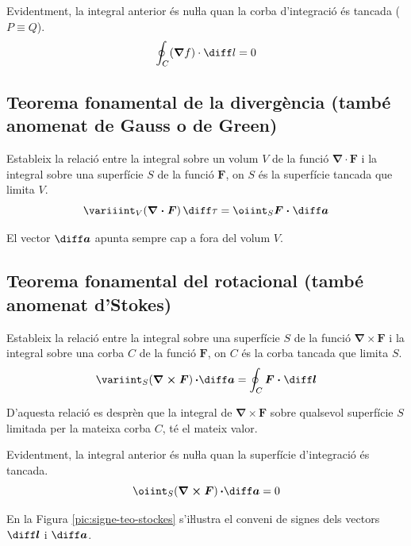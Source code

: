 \documentclass[catalan,a4paper,twoside,11pt]{article}
\begin{document}
Evidentment, la integral anterior és nuŀla quan la corba d'integració és tancada ($P \equiv Q$).
\begin{equation}
    \oint_C (\boldsymbol{\nabla}f) \cdot \diff l = 0
\end{equation}

\subsection{Teorema fonamental de la divergència (també anomenat de Gauss o de Green)}
Estableix la relació entre la integral sobre un volum $V$ de la funció $\boldsymbol{\nabla\cdot F}$ i la integral sobre una superfície $S$ de la funció $\boldsymbol{F}$, on $S$ és la superfície tancada que limita $V$.
\begin{equation}
    \variiint_V(\boldsymbol{\nabla\cdot F})\,\diff \tau = \oiint_S\boldsymbol{F\cdot\diff a}
\end{equation}

El vector $\boldsymbol{\diff a}$ apunta sempre cap a fora del volum $V$.

\subsection{Teorema fonamental del rotacional (també anomenat d'Stokes)}
Estableix la relació entre la integral sobre una superfície $S$ de la funció $\boldsymbol{\nabla\times F}$ i la integral sobre una corba $C$ de la funció $\boldsymbol{F}$, on $C$ és la corba tancada que limita $S$.
\begin{equation}
    \variint_S(\boldsymbol{\nabla\times F})\boldsymbol{\,\cdot\diff a} =
    \oint_C\boldsymbol{F\cdot\diff l}
\end{equation}

D'aquesta relació es desprèn que la integral de $\boldsymbol{\nabla\times F}$ sobre qualsevol superfície $S$ limitada per la mateixa corba $C$, té el mateix valor.

Evidentment, la integral anterior és nuŀla quan la superfície d'integració és tancada.
\begin{equation}
    \oiint_S(\boldsymbol{\nabla\times F})\boldsymbol{\,\cdot\diff a} = 0
\end{equation}

En la Figura \vref{pic:signe-teo-stockes} s'iŀlustra el conveni de
signes dels vectors $\boldsymbol{\diff l}$ i $\boldsymbol{\diff a}$.
\end{document}
